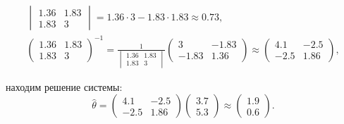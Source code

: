 \documentclass[a4paper,12pt]{article}
\begin{document}
\begin{enumerate}
\begin{gather*}
              \begin{vmatrix}
                  1.36 & 1.83 \\
                  1.83 & 3
              \end{vmatrix}
              = 1.36 \cdot 3 - 1.83 \cdot 1.83
              \approx 0.73, \\
              \begin{pmatrix}
                  1.36 & 1.83 \\
                  1.83 & 3
              \end{pmatrix}^{-1}
              =
              \frac{1}{
                  \begin{vmatrix}
                      1.36 & 1.83 \\
                      1.83 & 3
                  \end{vmatrix}
              }
              \begin{pmatrix}
                  3     & -1.83 \\
                  -1.83 & 1.36
              \end{pmatrix}
              \approx
              \begin{pmatrix}
                  4.1  & -2.5 \\
                  -2.5 & 1.86
              \end{pmatrix} ,
          \end{gather*}

          находим решение системы:
          \[
              \widehat{\theta}
              =
              \begin{pmatrix}
                  4.1  & -2.5 \\
                  -2.5 & 1.86
              \end{pmatrix}
              \begin{pmatrix}
                  3.7 \\
                  5.3
              \end{pmatrix}
              \approx
              \begin{pmatrix}
                  1.9 \\
                  0.6
              \end{pmatrix} .
          \]


\end{enumerate}
\end{document}
